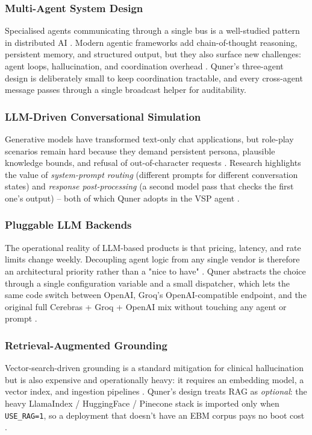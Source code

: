 \documentclass{article}
\begin{document}
\subsubsection{Multi-Agent System Design}
Specialised agents communicating through a single bus is a well-studied pattern in distributed AI \cite{Cheptsov2013IntroducingAN}. Modern agentic frameworks add chain-of-thought reasoning, persistent memory, and structured output, but they also surface new challenges: agent loops, hallucination, and coordination overhead \cite{Jing2024WhenLL}. Quner's three-agent design is deliberately small to keep coordination tractable, and every cross-agent message passes through a single broadcast helper for auditability.

\subsubsection{LLM-Driven Conversational Simulation}
Generative models have transformed text-only chat applications, but role-play scenarios remain hard because they demand persistent persona, plausible knowledge bounds, and refusal of out-of-character requests \cite{Topsakal2023CreatingLL}. Research highlights the value of \emph{system-prompt routing} (different prompts for different conversation states) and \emph{response post-processing} (a second model pass that checks the first one's output) -- both of which Quner adopts in the VSP agent \cite{Zhao2023ASO}.

\subsubsection{Pluggable LLM Backends}
The operational reality of LLM-based products is that pricing, latency, and rate limits change weekly. Decoupling agent logic from any single vendor is therefore an architectural priority rather than a "nice to have" \cite{Mahajan2022TextualDQ}. Quner abstracts the choice through a single configuration variable and a small dispatcher, which lets the same code switch between OpenAI, Groq's OpenAI-compatible endpoint, and the original full Cerebras + Groq + OpenAI mix without touching any agent or prompt \cite{Kulkarni2023TheEO}.

\subsubsection{Retrieval-Augmented Grounding}
Vector-search-driven grounding is a standard mitigation for clinical hallucination but is also expensive and operationally heavy: it requires an embedding model, a vector index, and ingestion pipelines \cite{Monir2024VectorSearchED}. Quner's design treats RAG as \emph{optional}: the heavy LlamaIndex / HuggingFace / Pinecone stack is imported only when \texttt{USE\_RAG=1}, so a deployment that doesn't have an EBM corpus pays no boot cost \cite{Rygl2017SemanticVE}.
\end{document}
